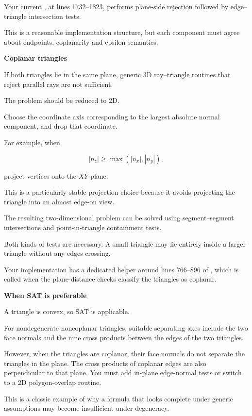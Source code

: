 Your current ,  at lines 1732--1823, performs plane-side rejection followed by edge--triangle intersection tests.

This is a reasonable implementation structure, but each component must agree about endpoints, coplanarity and epsilon semantics.

\textbf{Coplanar triangles}

If both triangles lie in the same plane, generic 3D ray--triangle routines that reject parallel rays are not sufficient.

The problem should be reduced to 2D.

Choose the coordinate axis corresponding to the largest absolute normal component, and drop that coordinate.

For example, when

\[
|n_z|\ge\max(|n_x|,|n_y|),
\]

project vertices onto the \(XY\) plane.

This is a particularly stable projection choice because it avoids projecting the triangle into an almost edge-on view.

The resulting two-dimensional problem can be solved using segment--segment intersections and point-in-triangle containment tests.

Both kinds of tests are necessary. A small triangle may lie entirely inside a larger triangle without any edges crossing.

Your implementation has a dedicated  helper around lines 766--896 of , which is called when the plane-distance checks classify the triangles as coplanar.

\textbf{When SAT is preferable}

A triangle is convex, so SAT is applicable.

For nondegenerate noncoplanar triangles, suitable separating axes include the two face normals and the nine cross products between the edges of the two triangles.

However, when the triangles are coplanar, their face normals do not separate the triangles in the plane. The cross products of coplanar edges are also perpendicular to that plane. You must add in-plane edge-normal tests or switch to a 2D polygon-overlap routine.

This is a classic example of why a formula that looks complete under generic assumptions may become insufficient under degeneracy.

